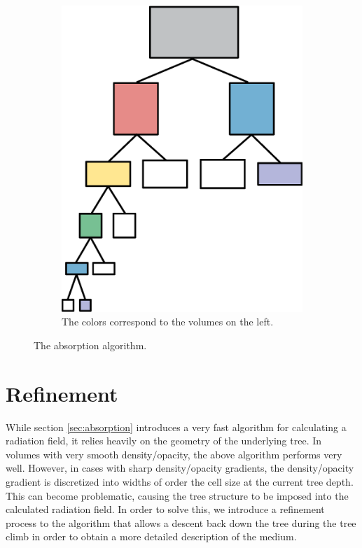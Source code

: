 \begin{figure}
\begin{subfigure}[b]{0.45\textwidth}
                \includegraphics[width=\textwidth]{graphics/RT_tree.eps}
                \caption{The colors correspond to the volumes on the left.}
                \label{fig:absorptiontree}
        \end{subfigure}
        \caption[The absorption algorithm.]{The absorption algorithm.}\label{fig:absorption}
\end{figure}

\section{Refinement}
\label{sec:refinement}

While section \ref{sec:absorption} introduces a very fast algorithm for calculating a radiation field, it relies heavily on the geometry of the underlying tree. In volumes with very smooth density/opacity, the above algorithm performs very well. However, in cases with sharp density/opacity gradients, the density/opacity gradient is discretized into widths of order the cell size at the current tree depth. This can become problematic, causing the tree structure to be imposed into the calculated radiation field. In order to solve this, we introduce a refinement process to the algorithm that allows a descent back down the tree during the tree climb in order to obtain a more detailed description of the medium.

